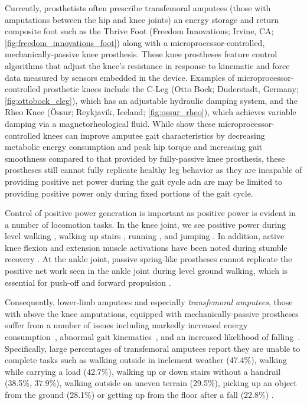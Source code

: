 Currently, prosthetists often prescribe transfemoral amputees (those with
amputations between the hip and knee joints) an energy storage and return
composite foot such as the Thrive Foot (Freedom Innovations; Irvine, CA;
\cref{fig:freedom_innovations_foot}) along with a microprocessor-controlled,
mechanically-passive knee prosthesis. These knee prostheses feature control
algorithms that adjust the knee's resistance in response to kinematic and force
data measured by sensors embedded in the device. Examples of
microprocessor-controlled prosthetic knees include the C-Leg (Otto Bock;
Duderstadt, Germany; \cref{fig:ottobock_cleg}), which has an adjustable
hydraulic damping system, and the Rheo Knee (Össur; Reykjavik, Iceland;
\cref{fig:ossur_rheo}), which achieves variable damping via a magnetorheological
fluid. While \citet{johansson2005clinical} show these microprocessor-controlled
knees can improve amputee gait characteristics by decreasing metabolic energy
consumption and peak hip torque and increasing gait smoothness compared to that
provided by fully-passive knee prosthesis, these prostheses still cannot fully
replicate healthy leg behavior as they are incapable of providing positive net 
power during the gait cycle adn are may be limited to providing positive power
only during fixed portions of the gait cycle.

Control of positive power generation is important as positive power is evident
in a number of locomotion tasks. In the knee joint, we see positive power during
level walking \citep{perry2010gait}, walking up stairs
\citep{nadeau2003frontal}, running \citep{buczek1990stance}, and jumping
\citep{hubley1983work}. In addition, active knee flexion and extension muscle
activations have been noted during stumble recovery \citep{eng1994strategies}.
At the ankle joint, passive spring-like prostheses cannot replicate the positive
net work seen in the ankle joint during level ground walking, which is essential
for push-off and forward propulsion \citep{perry2010gait}.

Consequently, lower-limb amputees and especially \emph{transfemoral amputees},
those with above the knee amputations, equipped with mechanically-passive
prostheses suffer from a number of issues including markedly increased energy
consumption~\citep{waters1976energy}, abnormal gait
kinematics~\citep{jaegers1995prosthetic}, and an increased likelihood of
falling~\citep{miller2001prevalence}. Specifically, large percentages of
transfemoral amputees report they are unable to complete tasks such as walking
outside in inclement weather (47.4\%), walking while carrying a load (42.7\%),
walking up or down stairs without a handrail (38.5\%, 37.9\%), walking outside
on uneven terrain (29.5\%), picking up an object from the ground (28.1\%) or
getting up from the floor after a fall (22.8\%) \citep{gauthier1999enabling}.

